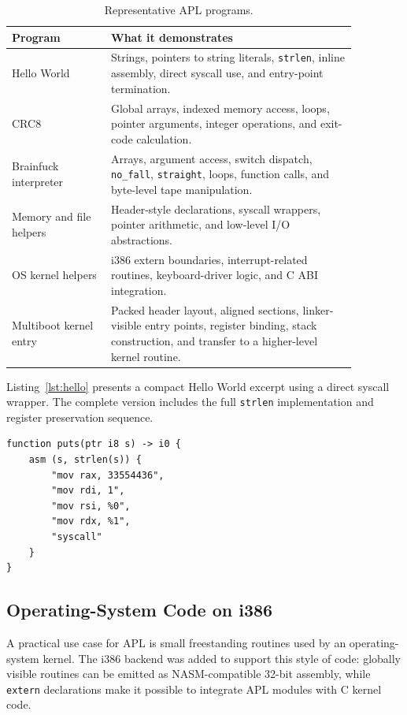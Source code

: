 \documentclass[10pt,twocolumn]{article}
\begin{document}
\begin{table}[htbp]
\centering
\caption{Representative APL programs.}
\begin{tabular}{p{0.25\linewidth}p{0.62\linewidth}}
\toprule
Program & What it demonstrates \\
\midrule
Hello World & Strings, pointers to string literals, \texttt{strlen}, inline assembly, direct syscall use, and entry-point termination. \\
CRC8 & Global arrays, indexed memory access, loops, pointer arguments, integer operations, and exit-code calculation. \\
Brainfuck interpreter & Arrays, argument access, switch dispatch, \texttt{no\_fall}, \texttt{straight}, loops, function calls, and byte-level tape manipulation. \\
Memory and file helpers & Header-style declarations, syscall wrappers, pointer arithmetic, and low-level I/O abstractions. \\
OS kernel helpers & i386 extern boundaries, interrupt-related routines, keyboard-driver logic, and C ABI integration. \\
Multiboot kernel entry & Packed header layout, aligned sections, linker-visible entry points, register binding, stack construction, and transfer to a higher-level kernel routine. \\
\bottomrule
\end{tabular}
\end{table}

\par Listing~\ref{lst:hello} presents a compact Hello World excerpt using a direct syscall wrapper. The complete version includes the full \texttt{strlen} implementation and register preservation sequence.

\begin{lstlisting}[language=APL,caption={Shortened Hello World with explicit syscall wrapper.},label={lst:hello}]
function puts(ptr i8 s) -> i0 {
    asm (s, strlen(s)) {
        "mov rax, 33554436",
        "mov rdi, 1",
        "mov rsi, %0",
        "mov rdx, %1",
        "syscall"
    }
}
\end{lstlisting}

\subsection{Operating-System Code on i386}

\par A practical use case for APL is small freestanding routines used by an operating-system kernel. The i386 backend was added to support this style of code: globally visible routines can be emitted as NASM-compatible 32-bit assembly, while \texttt{extern} declarations make it possible to integrate APL modules with C kernel code.
\end{document}
